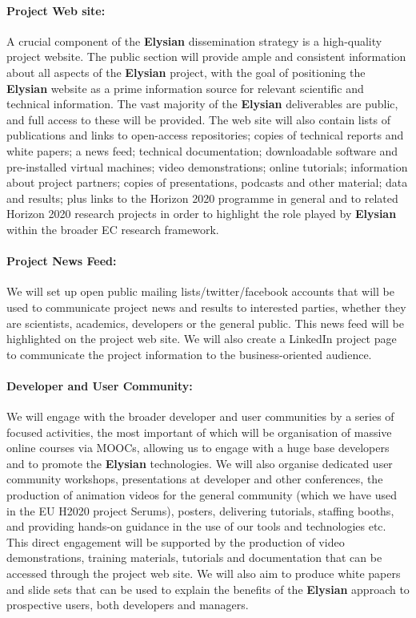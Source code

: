 \documentclass[a4paper,11pt]{article}
\newcommand{\project}[1]{\textbf{#1}\xspace}
\newcommand{\SECURITY}{\project{Elysian}}
\newcommand{\TheProject}{\SECURITY}
\begin{document}
\paragraph{Project Web site:}  
A crucial component of the \TheProject{} dissemination strategy is a
high-quality project website. The public section will provide ample
and consistent information about all aspects of the \TheProject{}
project, with the goal of positioning the \TheProject{} website as a
prime information source for relevant scientific and technical
information.  The vast majority of the \TheProject{} deliverables are
public, and full access to these will be provided.  The web site will also contain lists of publications and links
to open-access repositories; copies of technical reports and white
papers; a news feed; technical documentation; downloadable software
and pre-installed virtual machines; video demonstrations; online
tutorials; information about project partners; copies of
presentations, podcasts and other material; data and results; plus
links to the Horizon 2020 programme in general and to related 
Horizon 2020 research projects in order to highlight the role played by \TheProject{} within the
broader EC research framework.

\paragraph{Project News Feed:}  We will set up open public mailing lists/twitter/facebook accounts that will
be used to communicate project news and results to interested parties, whether they are scientists, academics, developers
or the general public.  This news feed will be highlighted on the project web site. We will also create a LinkedIn project page to 
communicate the project information to the business-oriented audience.

\paragraph{Developer and User Community:} We will engage with the broader
developer and user communities by a series of focused activities, the most important of which will be organisation of massive online courses via MOOCs, allowing us to engage with a huge base developers and to promote the \TheProject{} technologies.
 We will also organise dedicated user community workshops, presentations at
 developer and other conferences, 
 the production of animation videos for the general community (which we have used in the EU H2020 project Serums), posters, delivering tutorials, staffing booths, and providing hands-on
 guidance in the use of our tools and technologies etc.  This direct engagement will be
 supported by the production of video demonstrations, training materials, tutorials and documentation that can
 be accessed through the project web site.  We will also aim to produce white papers and slide sets that
 can be used to explain the benefits of the \TheProject{} approach to prospective users, both developers
 and managers.
\end{document}
